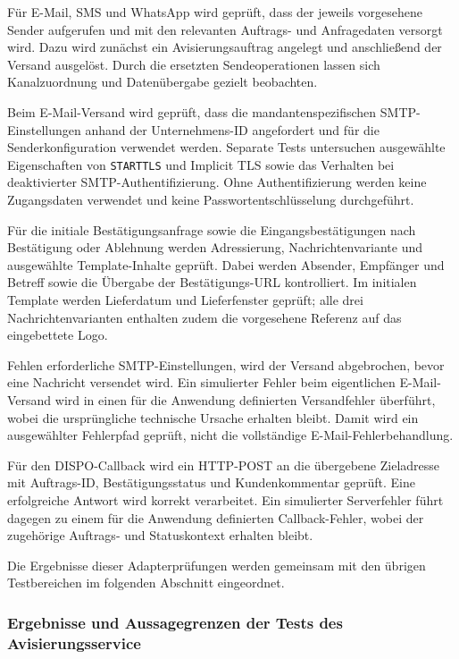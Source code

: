 Für E-Mail, SMS und WhatsApp wird geprüft, dass der jeweils vorgesehene Sender
aufgerufen und mit den relevanten Auftrags- und Anfragedaten versorgt wird. Dazu
wird zunächst ein Avisierungsauftrag angelegt und anschließend der Versand
ausgelöst. Durch die ersetzten Sendeoperationen lassen sich Kanalzuordnung und
Datenübergabe gezielt beobachten.

Beim E-Mail-Versand wird geprüft, dass die mandantenspezifischen
SMTP-Einstellungen anhand der Unternehmens-ID angefordert und für die
Senderkonfiguration verwendet werden. Separate Tests untersuchen ausgewählte
Eigenschaften von \texttt{STARTTLS} und Implicit TLS sowie das Verhalten bei
deaktivierter SMTP-Authentifizierung. Ohne Authentifizierung werden keine
Zugangsdaten verwendet und keine Passwortentschlüsselung durchgeführt.

Für die initiale Bestätigungsanfrage sowie die Eingangsbestätigungen nach
Bestätigung oder Ablehnung werden Adressierung, Nachrichtenvariante und
ausgewählte Template-Inhalte geprüft. Dabei werden Absender, Empfänger und
Betreff sowie die Übergabe der Bestätigungs-URL kontrolliert. Im initialen
Template werden Lieferdatum und Lieferfenster geprüft; alle drei
Nachrichtenvarianten enthalten zudem die vorgesehene Referenz auf das
eingebettete Logo.

Fehlen erforderliche SMTP-Einstellungen, wird der Versand abgebrochen, bevor
eine Nachricht versendet wird. Ein simulierter Fehler beim eigentlichen
E-Mail-Versand wird in einen für die Anwendung definierten Versandfehler
überführt, wobei die ursprüngliche technische Ursache erhalten bleibt. Damit
wird ein ausgewählter Fehlerpfad geprüft, nicht die vollständige
E-Mail-Fehlerbehandlung.

Für den DISPO-Callback wird ein HTTP-POST an die übergebene Zieladresse mit
Auftrags-ID, Bestätigungsstatus und Kundenkommentar geprüft. Eine erfolgreiche
Antwort wird korrekt verarbeitet. Ein simulierter Serverfehler führt dagegen
zu einem für die Anwendung definierten Callback-Fehler, wobei der zugehörige
Auftrags- und Statuskontext erhalten bleibt.

Die Ergebnisse dieser Adapterprüfungen werden gemeinsam mit den übrigen
Testbereichen im folgenden Abschnitt eingeordnet.

\subsubsection{Ergebnisse und Aussagegrenzen der Tests des Avisierungsservice}
\label{sec:test-ergebnisse-aussagegrenzen}

